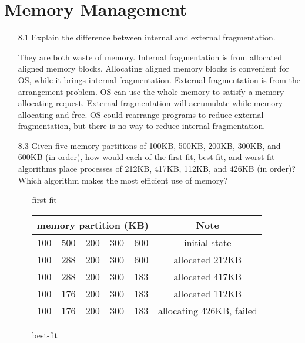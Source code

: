 \chapter{Memory Management}

\begin{enumerate}
    \item [8.1] Explain the difference between internal and external fragmentation.
    
    They are both waste of memory. Internal fragmentation is from allocated aligned memory blocks. Allocating aligned memory blocks is convenient for OS, while it brings internal fragmentation. External fragmentation is from the arrangement problem. OS can use the whole memory to satisfy a memory allocating request. External fragmentation will accumulate while memory allocating and free. OS could rearrange programs to reduce external fragmentation, but there is no way to reduce internal fragmentation.
    
    \item [8.3] Given five memory partitions of 100KB, 500KB, 200KB, 300KB, and 600KB (in order), how would each of the first-fit, best-fit, and worst-fit algorithms place processes of 212KB, 417KB, 112KB, and 426KB (in order)? Which algorithm makes the most efficient use of memory?
    
    \begin{enumerate}
        \item [first-fit] 
        
        \begin{tabular}{|c|c|c|c|c|c|}
        \hline
        \multicolumn{5}{|c|}{memory partition (KB)} & Note \\
        \hline
        100 & 500 & 200 & 300 & 600 & initial state \\
        \hline
        100 & 288 & 200 & 300 & 600 & allocated 212KB \\
        \hline
        100 & 288 & 200 & 300 & 183 & allocated 417KB \\
        \hline
        100 & 176 & 200 & 300 & 183 & allocated 112KB \\
        \hline
        100 & 176 & 200 & 300 & 183 & allocating 426KB, failed \\
        \hline
        \end{tabular}
        
        \item [best-fit]
        

\end{enumerate}
\end{enumerate}
